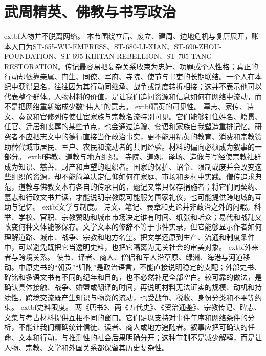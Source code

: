 \section{武周精英、佛教与书写政治} \label{sec:wu-zhou-elites-buddhism-writing}  \noindent	extbf{人物并不脱离网络。} 本节围绕立后、废立、建周、边地危机与复唐展开，账本入口为ST-655-WU-EMPRESS、ST-680-LI-XIAN、ST-690-ZHOU-FOUNDATION、ST-695-KHITAN-REBELLION、ST-705-TANG-RESTORATION。传记最容易把复杂关系收束为忠奸、功罪或个人性格；真正的行动却依靠亲属、门生、同僚、军府、寺院、使节与书吏的长期联结。一个人在本纪中获得显名，往往因为其行动同继承、战争或制度转折相接；这并不表示他可以代表整个群体。人物材料的价值，是让我们追问资源和信息如何在网络中流动，而不是把网络重新缩成少数“伟人”的意志。  \noindent	extbf{精英的可见性。} 墓志、家传、诗文、奏议和官修列传使仕宦家族与宗教名流特别可见。它们能够钉住姓名、籍贯、任官、迁居和丧葬的某些节点，也会通过追赠、套语和家族自我塑造重排记忆。研究者不应把志文中的德行直接当作政治事实，更不能用精英的教育、消费和宗教赞助替代城市居民、军户、农民和流动者的共同经验。材料的偏向必须成为叙事的一部分。  \noindent	extbf{佛教、道教与地方组织。} 寺院、道观、译场、造像与写经使宗教社群成为知识、慈善、财产和声望的组织者。国家的保护、诏令、限制或废并会改变这些组织的资源，却不能简单决定信仰如何在家庭、市场和乡村中实践。僧传追求典范，道教与佛教文本有各自的传承目的，题记又常只保存捐施者；将它们同契约、墓志和行政文书并读，才能说明宗教既可能服务国家礼仪，也可能提供跨地域的互助与记忆。  \noindent	extbf{文学与制度。} 诗文、笔记、表章和史论并非政治之外的闲暇。科举、学校、官职、宗教赞助和城市市场决定谁有时间、纸张和听众；易代和战乱又改变何种文体能够保存。文学文本的修辞不等于事件实录，但它能够显示作者如何理解道路、城市、战争、宗教和地方名望。把文学还原到生产、流通和制度条件中，可以避免既把它当透明史料，也把它隔离为无关社会的审美对象。  \noindent	extbf{外来者与跨境关系。} 使节、译者、商人、僧侣和军人沿草原、绿洲、海港与河道移动。中原史书的“朝贡”“归附”是政治语言，不能直接说明稳定的支配；外部史书、碑铭和多语文书有不同的纪年和目的，也不必然补足全部空白。较可靠的做法，是确认具体接触、战争、婚盟或翻译的时间，再说明材料无法证实的规模、动机和持续性。跨境交流既产生知识与物资的流动，也受战争、税收、身份分类和不平等约束。  \noindent	extbf{史料限度。} 两《唐书》、两《五代史》、《资治通鉴》、宗教传记、碑志、文集与考古材料提供互相不同的窗口。它们足以支持对事件年序和网络条件的分析，不能让我们精确统计信徒、读者、商人或地方追随者。叙事应把可确认的任命、文本和行动，与推测性的社会后果明确分开；这种节制不是减少解释，而是让人物、宗教、文学和外国关系都保留其历史复杂性。  